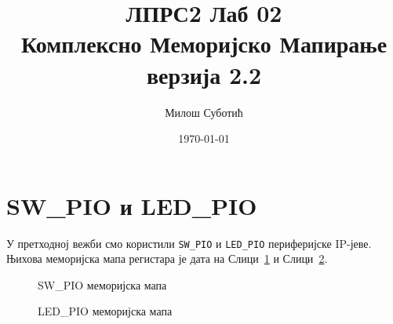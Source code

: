 \documentclass[12pt]{article}
\title{
	ЛПРС2 Лаб 02\\
	{\normalsize Комплексно Меморијско Мапирање}\\
	{\small верзија 2.2}
}
\author{Милош Суботић}
\date{\today}
\def\regWD{-4mm}
\def\regHO{-30mm}
\def\regH{-13mm}
\def\regRWO{\regH-0mm}
\def\regIVO{\regRWO-5mm}
\newcommand{\regBitLegend}[1]{%
	\node[anchor=south east] at (32*\regWD, #1*\regHO) {Bits};
}
\newcommand{\regBit}[2]{%
	\node[anchor=south] at (#2*\regWD+0.5*\regWD, #1*\regHO) {#2};
}
\newcommand{\regAddr}[2]{%
	\node[anchor=east] at (32*\regWD, #1*\regHO+0.5*\regH) {#2};
}
\newcommand{\regField}[4]{%
	\draw (#2*\regWD+\regWD, #1*\regHO) rectangle (#3*\regWD, #1*\regHO+\regH)
		node[pos=.5] {#4};
}
\newcommand{\regRWLegend}[1]{%
	\node[anchor=north east] at (32*\regWD, #1*\regHO+\regRWO) {Read/Write};
}
\newcommand{\regRW}[4]{%
	\node[anchor=north] at 
		(
			#2*0.5*\regWD + #3*0.5*\regWD + 0.5*\regWD,
			#1*\regHO+\regRWO
		)
		{#4};
}
\newcommand{\regInitLegend}[1]{%
	\node[anchor=north east] at (32*\regWD, #1*\regHO+\regIVO) {Inital Value};
}
\newcommand{\regInit}[4]{%
	\node[anchor=north] at 
		(
			#2*0.5*\regWD + #3*0.5*\regWD + 0.5*\regWD,
			#1*\regHO+\regIVO
		)
		{#4};
}
\newcommand{\regStd}[2]{%
	\regBitLegend{#1}
	\regAddr{#1}{#2}
	\regRWLegend{#1}
	\regInitLegend{#1}
	\regBit{#1}{31}
	\regBit{#1}{0}
}
\begin{document}
\sloppy %



\clearpage
\maketitle
\thispagestyle{empty}


\section{SW\_PIO и LED\_PIO}
\par
У претходној вежби смо користили \verb|SW_PIO| и \verb|LED_PIO|
периферијске IP-јеве.
Њихова меморијска мапа регистара је дата на
Слици~\ref{fig:sw_pio_mm} и Слици~\ref{fig:led_pio_mm}.

\begin{figure}[H]
	\centering
	
	\caption{\textsc{SW\_PIO} меморијска мапа}
	\label{fig:sw_pio_mm}
\end{figure}

\begin{figure}[H]
	\centering
	
	\caption{\textsc{LED\_PIO} меморијска мапа}
	\label{fig:led_pio_mm}
\end{figure}
\end{document}

